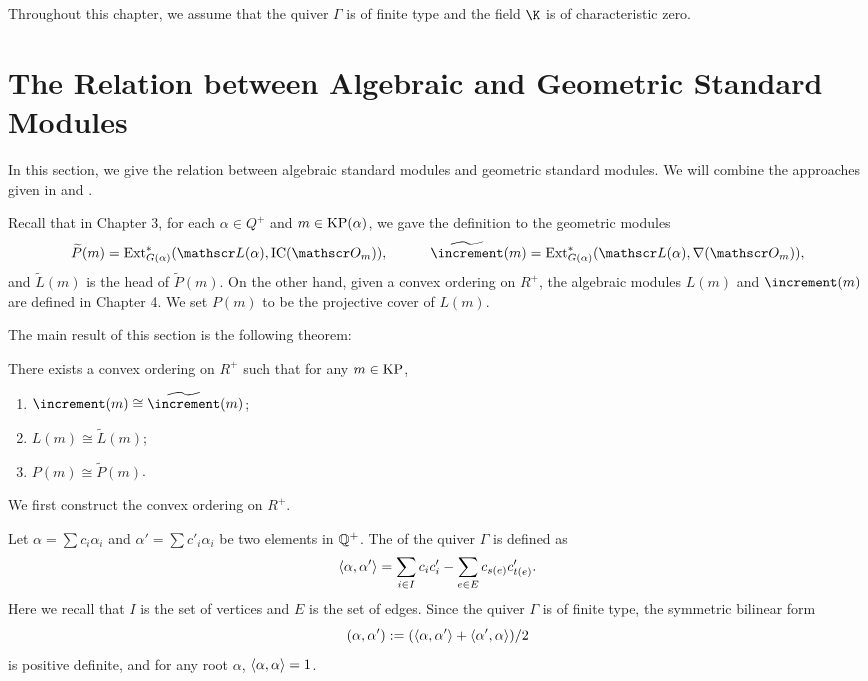 Throughout this chapter, we assume that the quiver $\Gamma$ is of finite type
and the field $\K$ is of characteristic zero.

\section{The Relation between Algebraic and Geometric Standard Modules}

In this section, we give the relation between algebraic standard modules
and geometric standard modules. We will combine the approaches
given in \cite{K2} and \cite{Mc2}.

Recall that in Chapter 3, for each $\alpha\in Q^+$ and $m\in\operatorname{KP}(\alpha)$,
we gave the definition to the geometric modules $$\widetilde{P}(m)
 = \Ext^*_{G(\alpha)}(\LL(\alpha),\IC(\OO_m)),\hspace{3em}
\widetilde{\std}(m) = \Ext^*_{G(\alpha)}(\LL(\alpha),\costd(\OO_m)),$$
and $\widetilde{L}(m)$ is the head of $\widetilde{P}(m)$. On the other hand,
given a convex ordering on $R^+$, the algebraic modules
$L(m)$ and $\std(m)$ are defined in Chapter 4. We set $P(m)$
to be the projective cover of $L(m)$.

The main result of this section is the following theorem:

\begin{theorem}\label{alg-geo}
    There exists a convex ordering on $R^+$ such that for any 
    $m\in\operatorname{KP}$,
    \begin{enumerate}[1)]
        \item $\std(m)\cong\widetilde{\std}(m)$;
        \item $L(m)\cong\widetilde{L}(m)$;
        \item $P(m)\cong\widetilde{P}(m)$.
    \end{enumerate}
\end{theorem}

We first construct the convex ordering on $R^+$.

Let $\alpha = \sum c_i\alpha_i$ and $\alpha' = \sum c'_i\alpha_i$
be two elements in $\mathbb{Q}^+$. The  of the 
quiver $\Gamma$ is defined as $$\left<\alpha,\alpha'\right>
 = \sum_{i\in I}c_ic'_i-\sum_{e\in E}c_{s(e)}c'_{t(e)}.$$
Here we recall that $I$ is the set of vertices and $E$
is the set of edges.
Since the quiver $\Gamma$ is of finite type, the symmetric
bilinear form 
\[
    (\alpha,\alpha') := (\left<\alpha,\alpha'\right>
    +\left<\alpha',\alpha\right>)/2
\] 
is positive definite, and 
for any root $\alpha$, $\left<\alpha,\alpha\right> = 1$.

